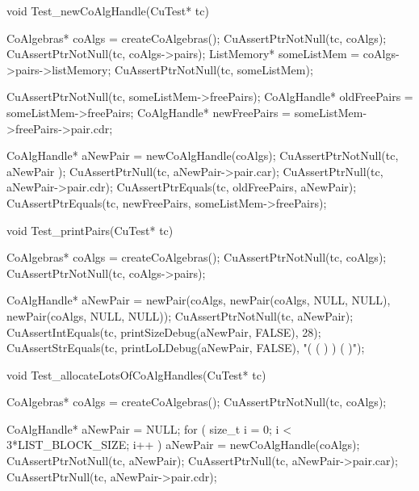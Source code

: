 void Test_newCoAlgHandle(CuTest* tc) {
  CoAlgebras* coAlgs = createCoAlgebras();
  CuAssertPtrNotNull(tc, coAlgs);
  CuAssertPtrNotNull(tc, coAlgs->pairs);
  ListMemory* someListMem = coAlgs->pairs->listMemory;
  CuAssertPtrNotNull(tc, someListMem);

  CuAssertPtrNotNull(tc, someListMem->freePairs);
  CoAlgHandle* oldFreePairs = someListMem->freePairs;
  CoAlgHandle* newFreePairs = someListMem->freePairs->pair.cdr;

  CoAlgHandle* aNewPair = newCoAlgHandle(coAlgs);
  CuAssertPtrNotNull(tc, aNewPair );
  CuAssertPtrNull(tc, aNewPair->pair.car);
  CuAssertPtrNull(tc, aNewPair->pair.cdr);
  CuAssertPtrEquals(tc, oldFreePairs, aNewPair);
  CuAssertPtrEquals(tc, newFreePairs, someListMem->freePairs);
}

void Test_printPairs(CuTest* tc) {
  CoAlgebras* coAlgs = createCoAlgebras();
  CuAssertPtrNotNull(tc, coAlgs);
  CuAssertPtrNotNull(tc, coAlgs->pairs);

  CoAlgHandle* aNewPair = newPair(coAlgs,
                               newPair(coAlgs, NULL, NULL),
                               newPair(coAlgs, NULL, NULL));
  CuAssertPtrNotNull(tc, aNewPair);
  CuAssertIntEquals(tc, printSizeDebug(aNewPair, FALSE), 28);
  CuAssertStrEquals(tc, printLoLDebug(aNewPair, FALSE), "( ( ) ) ( )");
}

void Test_allocateLotsOfCoAlgHandles(CuTest* tc) {
  CoAlgebras* coAlgs = createCoAlgebras();
  CuAssertPtrNotNull(tc, coAlgs);

  CoAlgHandle* aNewPair = NULL;
  for ( size_t i = 0; i < 3*LIST_BLOCK_SIZE; i++ ) {
    aNewPair = newCoAlgHandle(coAlgs);
  }
  CuAssertPtrNotNull(tc, aNewPair);
  CuAssertPtrNull(tc, aNewPair->pair.car);
  CuAssertPtrNull(tc, aNewPair->pair.cdr);
}

\stoptyping
